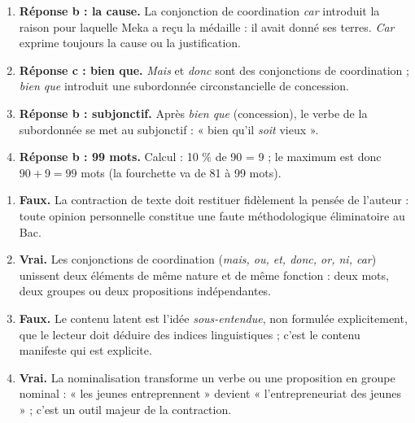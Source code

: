 \documentclass[11pt]{article}
\begin{document}
\begin{corrige}
\begin{enumerate}
\item \textbf{Réponse b : la cause.} La conjonction de coordination \emph{car} introduit la raison pour laquelle Meka a reçu la médaille : il avait donné ses terres. \emph{Car} exprime toujours la cause ou la justification.
\item \textbf{Réponse c : bien que.} \emph{Mais} et \emph{donc} sont des conjonctions de coordination ; \emph{bien que} introduit une subordonnée circonstancielle de concession.
\item \textbf{Réponse b : subjonctif.} Après \emph{bien que} (concession), le verbe de la subordonnée se met au subjonctif : « bien qu'il \emph{soit} vieux ».
\item \textbf{Réponse b : 99 mots.} Calcul : 10 \% de 90 = 9 ; le maximum est donc $90 + 9 = 99$ mots (la fourchette va de 81 à 99 mots).
\end{enumerate}
\end{corrige}

\begin{corrige}
\begin{enumerate}
\item \textbf{Faux.} La contraction de texte doit restituer fidèlement la pensée de l'auteur : toute opinion personnelle constitue une faute méthodologique éliminatoire au Bac.
\item \textbf{Vrai.} Les conjonctions de coordination (\emph{mais, ou, et, donc, or, ni, car}) unissent deux éléments de même nature et de même fonction : deux mots, deux groupes ou deux propositions indépendantes.
\item \textbf{Faux.} Le contenu latent est l'idée \emph{sous-entendue}, non formulée explicitement, que le lecteur doit déduire des indices linguistiques ; c'est le contenu manifeste qui est explicite.
\item \textbf{Vrai.} La nominalisation transforme un verbe ou une proposition en groupe nominal : « les jeunes entreprennent » devient « l'entrepreneuriat des jeunes » ; c'est un outil majeur de la contraction.
\end{enumerate}
\end{corrige}
\end{document}
